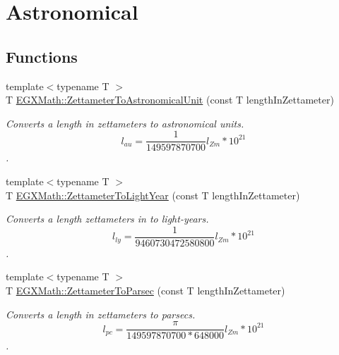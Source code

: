 \hypertarget{group___e_g_x_math-_conversions-_length_conversions-_zettameter-_astronomical}{}\section{Astronomical}
\label{group___e_g_x_math-_conversions-_length_conversions-_zettameter-_astronomical}
\subsection*{Functions}
\begin{DoxyCompactItemize}
\item 
{\footnotesize template$<$typename T $>$ }\\T \mbox{\hyperlink{group___e_g_x_math-_conversions-_length_conversions-_zettameter-_astronomical_ga11b503418631f04db17ad979cef5403a}{E\+G\+X\+Math\+::\+Zettameter\+To\+Astronomical\+Unit}} (const T length\+In\+Zettameter)
\begin{DoxyCompactList}\small\item\em Converts a length in zettameters to astronomical units. \[ l_{au}= \frac{1}{149597870700} l_{Zm} * 10^{21} \]. \end{DoxyCompactList}\item 
{\footnotesize template$<$typename T $>$ }\\T \mbox{\hyperlink{group___e_g_x_math-_conversions-_length_conversions-_zettameter-_astronomical_gacc76b416d7b6b3c4bd30cf8c5e924daf}{E\+G\+X\+Math\+::\+Zettameter\+To\+Light\+Year}} (const T length\+In\+Zettameter)
\begin{DoxyCompactList}\small\item\em Converts a length zettameters in to light-\/years. \[ l_{ly}= \frac{1}{9460730472580800} l_{Zm} * 10^{21} \]. \end{DoxyCompactList}\item 
{\footnotesize template$<$typename T $>$ }\\T \mbox{\hyperlink{group___e_g_x_math-_conversions-_length_conversions-_zettameter-_astronomical_ga7924b0bc32c99624e84dcfb09806f730}{E\+G\+X\+Math\+::\+Zettameter\+To\+Parsec}} (const T length\+In\+Zettameter)
\begin{DoxyCompactList}\small\item\em Converts a length in zettameters to parsecs. \[ l_{pc}=\frac{\pi}{149597870700 * 648000} l_{Zm} * 10^{21} \]. \end{DoxyCompactList}\end{DoxyCompactItemize}



